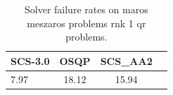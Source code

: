 \begin{table}
\centering
\caption{Solver failure rates on maros meszaros problems rnk 1 qr problems.}
\label{t-maros meszaros problems rnk 1 qr-failure}
\begin{tabular}{lccc}
\toprule
 SCS-3.0 &  OSQP &  SCS\_AA2 \\
\midrule
    7.97 & 18.12 &    15.94 \\
\bottomrule
\end{tabular}
\end{table}
